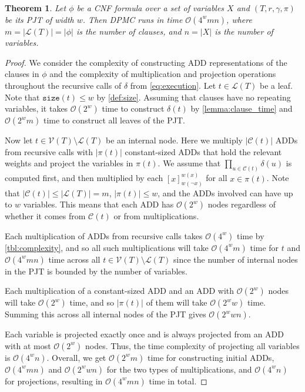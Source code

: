 \documentclass{article}
\newtheorem{theorem}{Theorem}
\theoremstyle{definition}
\theoremstyle{remark}
\begin{document}
\begin{theorem} \label{thm:main}
  Let $\phi$ be a CNF formula over a set of variables $X$ and $(T, r, \gamma,
  \pi)$ be its PJT of width $w$. Then \textsc{DPMC}
  \cite{DBLP:conf/cp/DudekPV20} runs in time $\mathcal{O}(4^wmn)$, where $m =
  |\mathcal{L}(T)| = |\phi|$ is the number of clauses, and $n = |X|$ is the
  number of variables.
\end{theorem}
\begin{proof}
  We consider the complexity of constructing ADD representations of the clauses
  in $\phi$ and the complexity of multiplication and projection operations
  throughout the recursive calls of $\delta$ from \cref{eq:execution}. Let $t
  \in \mathcal{L}(T)$ be a leaf. Note that $\mathtt{size}(t) \le w$ by
  \cref{def:size}. Assuming that clauses have no repeating variables, it takes
  $\mathcal{O}(2^w)$ time to construct $\delta(t)$ by \cref{lemma:clause_time}
  and $\mathcal{O}(2^wm)$ time to construct all leaves of the PJT.

  Now let $t \in \mathcal{V}(T) \setminus \mathcal{L}(T)$ be an internal node.
  Here we multiply $|\mathcal{C}(t)|$ ADDs from recursive calls with $|\pi(t)|$
  constant-sized ADDs that hold the relevant weights and project the variables
  in $\pi(t)$. We assume that $\prod_{u \in \mathcal{C}(t)} \delta(u)$ is
  computed first, and then multiplied by each $[x]_{w(\neg x)}^{w(x)}$ for all
  $x \in \pi(t)$. Note that $|\mathcal{C}(t)| \le |\mathcal{L}(T)| = m$,
  $|\pi(t)| \le w$, and the ADDs involved can have up to $w$ variables. This
  means that each ADD has $\mathcal{O}(2^w)$ nodes regardless of whether it
  comes from $\mathcal{C}(t)$ or from multiplications.

  Each multiplication of ADDs from recursive calls takes $\mathcal{O}(4^w)$ time
  by \cref{tbl:complexity}, and so all such multiplications will take
  $\mathcal{O}(4^wm)$ time for $t$ and $\mathcal{O}(4^wmn)$ time across all $t
  \in \mathcal{V}(T) \setminus \mathcal{L}(T)$ since the number of internal
  nodes in the PJT is bounded by the number of variables.

  Each multiplication of a constant-sized ADD and an ADD with $\mathcal{O}(2^w)$
  nodes will take $\mathcal{O}(2^w)$ time, and so $|\pi(t)|$ of them will take
  $\mathcal{O}(2^ww)$ time. Summing this across all internal nodes of the PJT
  gives $\mathcal{O}(2^wwn)$.

  Each variable is projected exactly once and is always projected from an ADD
  with at most $\mathcal{O}(2^w)$ nodes. Thus, the time complexity of projecting
  all variables is $\mathcal{O}(4^wn)$. Overall, we get $\mathcal{O}(2^wm)$ time
  for constructing initial ADDs, $\mathcal{O}(4^wmn)$ and $\mathcal{O}(2^wwn)$
  for the two types of multiplications, and $\mathcal{O}(4^wn)$ for projections,
  resulting in $\mathcal{O}(4^wmn)$ time in total.
\end{proof}
\end{document}

